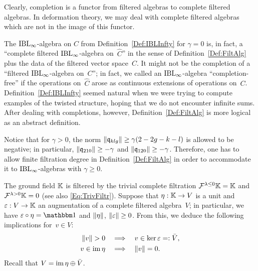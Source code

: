 \documentclass[\MainFolder/Text.tex]{subfiles}
\begin{document}
\begin{Remark}
\begin{RemarkList}
\item Clearly, completion is a functor from filtered algebras to complete filtered algebras. In deformation theory, we may deal with complete filtered algebras which are not in the image of this functor.
\item  The $\mathrm{IBL}_\infty$-algebra on $C$ from Definition~\ref{Def:IBLInfty} for $\gamma = 0$ is, in fact, a ``complete filtered $\mathrm{IBL}_\infty$-algebra on~$\hat{C}$'' in the sense of Definition~\ref{Def:FiltAlg} plus the data of the filtered vector space~$C$. It might not be the completion of a ``filtered $\mathrm{IBL}_\infty$-algebra on~$C$''; in fact, we called an $\mathrm{IBL}_\infty$-algebra ``completion-free'' if the operations on~$\hat{C}$ arose as continuous extensions of operations on~$C$. Definition~\ref{Def:IBLInfty} seemed natural when we were trying to compute examples of the twisted structure, hoping that we do not encounter infinite sums. After dealing with completions, however, Definition~\ref{Def:FiltAlg} is more logical as an abstract definition.

Notice that for $\gamma > 0$, the norm $\| \mathfrak{q}_{klg} \| \ge \gamma(2-2g-k-l)$ is allowed to be negative; in particular, $\| \mathfrak{q}_{210} \|\ge -\gamma$ and $\| \mathfrak{q}_{120} \|\ge -\gamma$. Therefore, one has to allow finite filtration degree in Definition~\ref{Def:FiltAlg} in order to accommodate it to $\mathrm{IBL}_\infty$-algebras with $\gamma \ge 0$.
\end{RemarkList}
\end{Remark}

\begin{Remark}\label{Rem:FiltrUnitAug}
The ground field $\mathbb{K}$ is filtered by the trivial complete filtration $\mathcal{F}^{\lambda\le 0}\mathbb{K} = \mathbb{K}$ and $\mathcal{F}^{\lambda>0}\mathbb{K} = 0$ (see also \eqref{Eq:TrivFiltr}). Suppose that $\eta: \mathbb{K} \rightarrow V$ is a unit and $\varepsilon: V \rightarrow \mathbb{K}$ an augmentation of a complete filtered algebra~$V$; in particular, we have $\MVAug \circ \MVUnit = \Id$ and $\| \eta \|$, $\| \varepsilon \|\ge 0$. From this, we deduce the following implications for~$v\in V$:
\begin{align*}
\Norm{v}>0 &\quad\Implies\quad v\in \ker \MVAug =: \bar{V},\\
v\in \im \MVUnit &\quad\Implies\quad \Norm{v} = 0.
\end{align*}
Recall that $V = \operatorname{im} \eta \oplus \bar{V}$.
\end{Remark}
\end{document}
